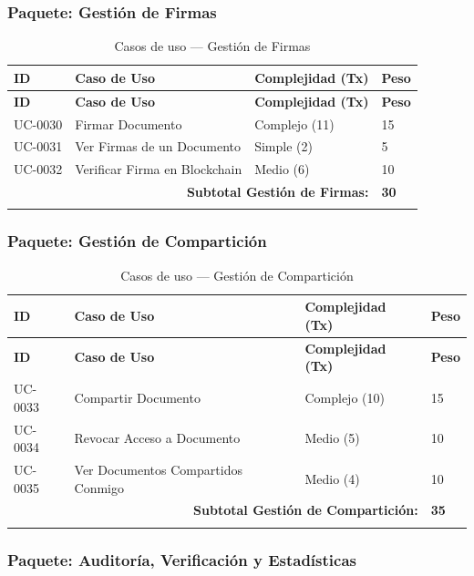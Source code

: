 \documentclass[11pt, a4paper]{article}
\begin{document}
\subsubsection*{Paquete: Gestión de Firmas}

\begin{longtable}{|p{1.8cm}|p{6.5cm}|p{3cm}|p{1.5cm}|}
\hline
\textbf{ID} & \textbf{Caso de Uso} & \textbf{Complejidad (Tx)} & \textbf{Peso} \\
\hline
\endfirsthead
\hline
\textbf{ID} & \textbf{Caso de Uso} & \textbf{Complejidad (Tx)} & \textbf{Peso} \\
\hline
\endhead
UC-0030 & Firmar Documento & Complejo (11) & 15 \\
\hline
UC-0031 & Ver Firmas de un Documento & Simple (2) & 5 \\
\hline
UC-0032 & Verificar Firma en Blockchain & Medio (6) & 10 \\
\hline
\multicolumn{3}{|r|}{\textbf{Subtotal Gestión de Firmas:}} & \textbf{30} \\
\hline
\caption{Casos de uso --- Gestión de Firmas}\label{tab:uc-firmas}
\end{longtable}

\subsubsection*{Paquete: Gestión de Compartición}

\begin{longtable}{|p{1.8cm}|p{6.5cm}|p{3cm}|p{1.5cm}|}
\hline
\textbf{ID} & \textbf{Caso de Uso} & \textbf{Complejidad (Tx)} & \textbf{Peso} \\
\hline
\endfirsthead
\hline
\textbf{ID} & \textbf{Caso de Uso} & \textbf{Complejidad (Tx)} & \textbf{Peso} \\
\hline
\endhead
UC-0033 & Compartir Documento & Complejo (10) & 15 \\
\hline
UC-0034 & Revocar Acceso a Documento & Medio (5) & 10 \\
\hline
UC-0035 & Ver Documentos Compartidos Conmigo & Medio (4) & 10 \\
\hline
\multicolumn{3}{|r|}{\textbf{Subtotal Gestión de Compartición:}} & \textbf{35} \\
\hline
\caption{Casos de uso --- Gestión de Compartición}\label{tab:uc-comparticion}
\end{longtable}

\subsubsection*{Paquete: Auditoría, Verificación y Estadísticas}
\end{document}
